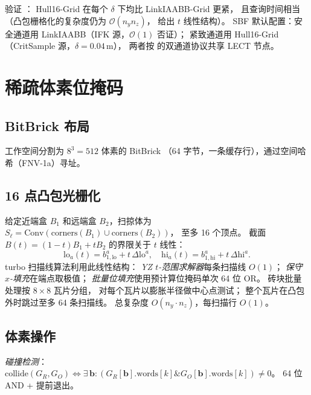 \documentclass[journal]{IEEEtran}
\begin{document}
 验证 ：
Hull16-Grid 在每个 $\delta$ 下均比 LinkIAABB-Grid 更紧，
且查询时间相当（凸包栅格化的复杂度仍为 $\mathcal{O}(n_yn_z)$，
 给出 $t$ 线性结构）。
SBF 默认配置：安全通道用 LinkIAABB（IFK 源，$\mathcal{O}(1)$ 否证）；
紧致通道用 Hull16-Grid（CritSample 源，$\delta=0.04$\,m），
两者按  的双通道协议共享 LECT 节点。

\section{稀疏体素位掩码}\label{sec:voxel}

\subsection{BitBrick 布局}

工作空间分割为 $8^3 = 512$ 体素的 BitBrick
（64 字节，一条缓存行），通过空间哈希（FNV-1a）寻址。

\subsection{16 点凸包光栅化}

给定近端盒 $B_1$ 和远端盒 $B_2$，扫掠体为
$S_\ell = \mathrm{Conv}(\mathrm{corners}(B_1) \cup \mathrm{corners}(B_2))$，
至多 16 个顶点。
截面 $B(t) = (1-t)B_1 + tB_2$ 的界限关于 $t$ 线性：
\begin{equation}\label{eq:bt_linear}
  \mathrm{lo}_a(t) = b_{1,\mathrm{lo}}^a + t\,\Delta\mathrm{lo}^a, \quad
  \mathrm{hi}_a(t) = b_{1,\mathrm{hi}}^a + t\,\Delta\mathrm{hi}^a.
\end{equation}
turbo 扫描线算法利用此线性结构：
\emph{YZ $t$-范围求解器}每条扫描线 $O(1)$；
\emph{保守 $x$-填充}在端点取极值；
\emph{批量位填充}使用预计算位掩码单次 64 位 OR。
砖块批量处理按 $8{\times}8$ 瓦片分组，
对每个瓦片以膨胀半径做中心点测试；
整个瓦片在凸包外时跳过至多 64 条扫描线。
总复杂度 $O(n_y \cdot n_z)$，每扫描行 $O(1)$。

\subsection{体素操作}

\emph{碰撞检测}：
$\text{collide}(G_R, G_O) \Leftrightarrow \exists\,\bm{b}:
(G_R[\bm{b}].\text{words}[k] \mathbin{\&} G_O[\bm{b}].\text{words}[k]) \ne 0$。
64 位 AND + 提前退出。
\end{document}
